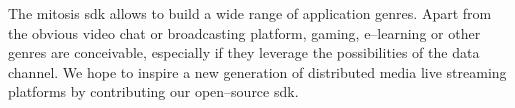 The \gls{mitosis} \gls{sdk} allows to build a wide range of application genres. Apart from the obvious video chat or broadcasting platform, gaming, e–learning or other genres are conceivable, especially if they leverage the possibilities of the data channel. We hope to inspire a new generation of distributed media live streaming platforms by contributing our open–source \gls{sdk}.

